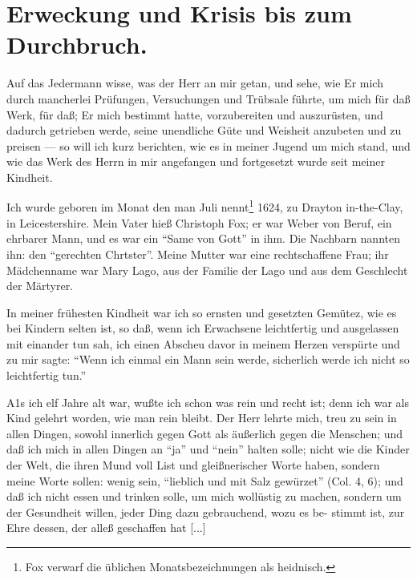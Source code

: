 \chapter[Erweckung und Krisis]{Erweckung und Krisis bis zum Durchbruch.}




Auf das Jedermann wisse, was der Herr an mir getan, und
sehe, wie Er mich durch mancherlei Prüfungen, Versuchungen und
Trübsale führte, um mich für daß Werk, für daß; Er mich bestimmt 
hatte, vorzubereiten und auszurüsten, und dadurch getrieben 
werde, seine unendliche Güte und Weisheit anzubeten und
zu preisen — so will ich kurz berichten, wie es in meiner Jugend
um mich stand, und wie das Werk des Herrn in mir angefangen
und fortgesetzt wurde seit meiner Kindheit.

Ich wurde geboren im Monat den man Juli nennt\footnote{Fox 
verwarf die üblichen Monatsbezeichnungen als heidnisch.} 1624,
zu Drayton in-the-Clay, in Leicestershire. Mein Vater hieß
Christoph Fox; er war Weber von Beruf, ein ehrbarer Mann,
und es war ein "`Same von Gott"' in ihm. Die Nachbarn
nannten ihn: den "`gerechten Chrtster"'. Meine Mutter war eine
rechtschaffene Frau; ihr Mädchenname war Mary Lago, aus der
Familie der Lago und aus dem Geschlecht der Märtyrer.

In meiner frühesten Kindheit war ich so ernsten und gesetzten
Gemütez, wie es bei Kindern selten ist, so daß, wenn ich Erwachsene 
leichtfertig und ausgelassen mit einander tun sah, ich
einen Abscheu davor in meinem Herzen verspürte und zu mir
sagte: "`Wenn ich einmal ein Mann sein werde, sicherlich werde
ich nicht so leichtfertig tun."'

A1s ich elf Jahre alt war, wußte ich schon was rein und
recht ist; denn ich war als Kind gelehrt worden, wie man rein
bleibt. Der Herr lehrte mich, treu zu sein in allen Dingen, sowohl
innerlich gegen Gott als äußerlich gegen die Menschen; und daß
ich mich in allen Dingen an "`ja"' und "`nein"' halten solle; nicht
wie die Kinder der Welt, die ihren Mund voll List und gleißnerischer
Worte haben, sondern meine Worte sollen: wenig sein, "`lieblich
und mit Salz gewürzet"' (Col. 4, 6); und daß ich nicht essen
und trinken solle, um mich wollüstig zu machen, sondern um der
Gesundheit willen, jeder Ding dazu gebrauchend, wozu es be-
stimmt ist, zur Ehre dessen, der alleß geschaffen hat [...]

